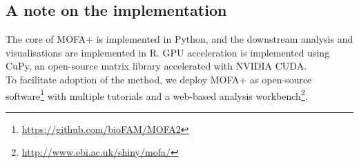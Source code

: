 \subsection{A note on the implementation}

The core of MOFA+ is implemented in Python, and the downstream analysis and visualisations are implemented in R. GPU acceleration is implemented using CuPy\cite{Okuta2017}, an open-source matrix library accelerated with NVIDIA CUDA.\\
To facilitate adoption of the method, we deploy MOFA+ as open-source software\footnote{\url{https://github.com/bioFAM/MOFA2}} with multiple tutorials and a web-based analysis workbench\footnote{\url{http://www.ebi.ac.uk/shiny/mofa/}}.%
